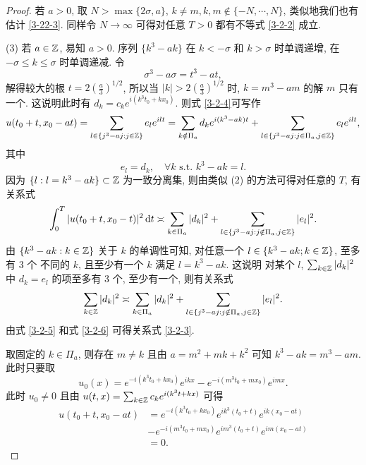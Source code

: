 \begin{proof}
    若 $a>0$, 取 $N>\max\lbrace 2\sigma, a\rbrace$, $k\neq m, k,m\notin \lbrace-N,\cdots, N\rbrace$, 类似地我们也有估计 \eqref{3-22-3}. 同样令 $N\to \infty$ 可得对任意 $T>0$ 都有不等式 \eqref{3-2-2} 成立. 
    
    (3) 若 $a\in \mathbb{Z}$, 易知 $a>0$. 序列 $\lbrace k^3-ak\rbrace$ 在 $k<-\sigma$ 和 $k>\sigma$ 时单调递增, 在 $-\sigma\le k\le \sigma$ 时单调递减. 令
    \begin{equation*}
        \sigma^3-a\sigma=t^3-at,
    \end{equation*}
    解得较大的根 $t=2\left(\frac{a}{3}\right)^{1 /2}$,
    所以当 $|k|> 2\left(\frac{a}{3}\right)^{1 /2}$ 时, $k=m^3-am$ 的解 $m$ 只有一个. 这说明此时有 $d_k=c_k e^{i(k^3t_0+kx_0)}$. 
    则式 \eqref{3-2-4}可写作
    \begin{equation*}
        u(t_0+t,x_0-at)=\sum_{l\in \lbrace j^3-aj:j\in \mathbb{Z}  \rbrace}e_l e^{ilt}=\sum_{k\notin \Pi_a} d_k e^{i(k^3-ak)t}+\sum_{l\in \lbrace j^3-aj: j\in \Pi_a, j\in \mathbb{Z}\rbrace} e_l e^{ilt},
    \end{equation*}  
    其中
    \begin{equation*}
        e_l=d_k, \quad \forall k \text{ s.t. } k^3-ak=l.
    \end{equation*}
    因为 $\lbrace l: l=k^3-ak \rbrace \subset \mathbb{Z} $ 为一致分离集, 则由类似 (2) 的方法可得对任意的 $T$, 有关系式
    \begin{equation}\label{3-2-5}
        \int_0^T|u(t_0+t,x_0-t)|^2\,\mathrm{d} t\asymp \sum_{k\in \Pi_a}|d_k|^2+\sum_{l\in \lbrace j^3-aj: j \notin \Pi_a,j\in\mathbb{Z}\rbrace }|e_l|^2.
    \end{equation}
    由 $\lbrace k^3-ak:k\in \mathbb{Z}\rbrace$ 关于 $k$ 的单调性可知, 对任意一个 $l\in \lbrace k^3-ak; k\in \mathbb{Z}\rbrace$, 至多有 3 个 不同的 $k$, 且至少有一个 $k$  满足 $l=k^3-ak$. 这说明 对某个 $l$, $\sum_{k\in\mathbb{Z}} |d_k|^2$ 中 $d_k=e_l$ 的项至多有 3 个, 至少有一个, 则有关系式
    \begin{equation}\label{3-2-6}
        \sum_{k\in \mathbb{Z}}|d_k|^2\asymp  \sum_{k\in \Pi_a}|d_k|^2+\sum_{l\in \lbrace j^3-aj: j \notin \Pi_a,j\in\mathbb{Z}\rbrace }|e_l|^2.
    \end{equation}
    由式 \eqref{3-2-5} 和式 \eqref{3-2-6} 可得关系式 \eqref{3-2-3}.
    
    取固定的 $k\in \Pi_a$,  则存在 $m\neq k$ 且由 $a=m^2+mk+k^2$ 可知 $k^3-ak=m^3-am$. 此时只要取
        \begin{equation*}
            u_0(x)=e^{-i(k^3t_0+kx_0)}e^{ikx}-e^{-i(m^3t_0+mx_0)}e^{imx}.
        \end{equation*}
此时 $u_0\neq 0$ 且由 $u(t,x)=\sum_{k\in\mathbb{Z}}c_k e^{i(k^3 t+kx)}$ 可得
        \begin{align*}
            u(t_0+t,x_0-at) &= e^{-i(k^3t_0+kx_0)}e^{ik^3(t_0+t)}e^{ik(x_0-at)}\\
            &-e^{-i(m^3t_0+mx_0)}e^{im^3(t_0+t)}e^{im(x_0-at)}\\
            &=0.
        \end{align*}


\end{proof}
